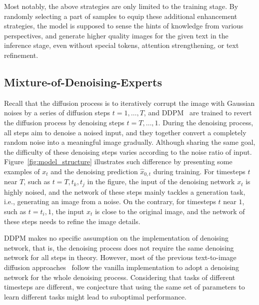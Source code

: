 \documentclass[10pt,twocolumn,letterpaper]{article}
\begin{document}
Most notably, the above strategies are only limited to the training stage. By randomly selecting a part of samples to equip these additional enhancement strategies, the model is supposed to sense the hints of knowledge from various perspectives, and generate higher quality images for the given text in the inference stage, even without special tokens, attention strengthening, or text refinement.


\subsection{Mixture-of-Denoising-Experts}

Recall that the diffusion process is to iteratively corrupt the image with Gaussian noises by a series of diffusion steps $t = 1,\dots,T$, and DDPM~\cite{DBLP:conf/nips/HoJA20} are trained to revert the diffusion process by denoising steps $t = T,\dots,1$.
During the denoising process, all steps aim to denoise a noised input, and they together convert a completely random noise into a meaningful image gradually.
Although sharing the same goal, the difficulty of these denoising steps varies according to the noise ratio of input.
Figure~\ref{fig:model_structure} illustrates such difference by presenting some examples of $x_t$ and the denoising prediction $\hat{x}_{0,t}$ during training. For timesteps $t$ near $T$, such as $t=T, t_k, t_j$ in the figure, the input of the denoising network $x_t$ is highly noised, and the network of these steps mainly tackles a generation task, i.e., generating an image from a noise.
On the contrary, for timesteps $t$ near $1$, such as $t=t_i, 1$, the input $x_t$ is close to the original image, and the network of these steps needs to refine the image details.

DDPM makes no specific assumption on the implementation of denoising network, that is, the denoising process does not require the same denoising network for all steps in theory.
However, most of the previous text-to-image diffusion approaches~\cite{DBLP:journals/corr/abs-2112-10752,DBLP:conf/icml/NicholDRSMMSC22,DBLP:journals/corr/abs-2204-06125,DBLP:journals/corr/abs-2205-11487} follow the vanilla implementation to adopt a denoising network for the whole denoising process.
Considering that tasks of different timesteps are different, we conjecture that using the same set of parameters to learn different tasks might lead to suboptimal performance.
\end{document}
